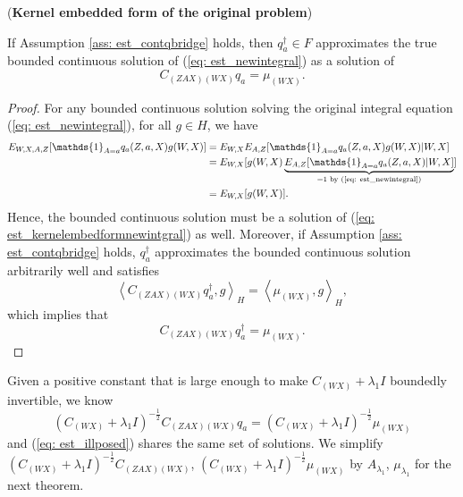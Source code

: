 \begin{lemma}(\textbf{Kernel embedded form of the original problem})
    
    If Assumption \ref{ass: est_contqbridge} holds, then $q_a^{\dagger}\in F$ approximates the true bounded continuous solution of (\ref{eq: est_newintegral}) as 
    a solution of
    \begin{equation*}
        C_{(ZAX)(WX)}q_a = \mu_{(WX)}.
    \end{equation*} 
\end{lemma}
\begin{proof}
    For any bounded continuous solution solving the original integral equation (\ref{eq: est_newintegral}), 
    for all $g\in H$, we have 
    \begin{align}
        \label{eq: est_kernelembedformnewintgral}
        E_{W,X,A,Z}[\mathds{1}_{A=a}q_a(Z,a,X)g(W,X)] &= E_{W,X}E_{A,Z}[\mathds{1}_{A=a}q_a(Z,a,X)g(W,X)|W,X] \notag \\ 
                                              &= E_{W,X}[g(W,X)\underbrace{E_{A,Z}[\mathds{1}_{A=a}q_a(Z,a,X)|W,X]}_{=1\text{ by (\ref{eq: est_newintegral})}}] \notag \\
                                              &= E_{W,X}[g(W,X)]. 
    \end{align}
    Hence, the bounded continuous solution must be a solution of (\ref{eq: est_kernelembedformnewintgral}) as well. 
    Moreover, if Assumption \ref{ass: est_contqbridge} holds, $q_a^{\dagger}$ approximates the bounded continuous solution arbitrarily well and satisfies 
    \begin{equation*}
        \left\langle C_{(ZAX)(WX)}q_a^{\dagger},g\right\rangle _H = \left\langle \mu_{(WX)},g\right\rangle _H, 
    \end{equation*}
    which implies that 
    \begin{equation}
        \label{eq: est_illposed}
        C_{(ZAX)(WX)}q_a^{\dagger} = \mu_{(WX)}. 
    \end{equation}
\end{proof}

Given a positive constant that is large enough to make $C_{(WX)}+\lambda_1I$ boundedly invertible, 
we know 
\begin{equation}
    \label{eq: est_kernelillposed}
    (C_{(WX)}+\lambda_1I)^{-\frac{1}{2}}C_{(ZAX)(WX)}q_a = (C_{(WX)}+\lambda_1I)^{-\frac{1}{2}}\mu_{(WX)}
\end{equation}
and (\ref{eq: est_illposed}) shares the same set of solutions.
We simplify $(C_{(WX)}+\lambda_1I)^{-\frac{1}{2}}C_{(ZAX)(WX)}$, $(C_{(WX)}+\lambda_1I)^{-\frac{1}{2}}\mu_{(WX)}$ by $A_{\lambda_1}$, $\mu_{\lambda_1}$ 
for the next theorem. 

